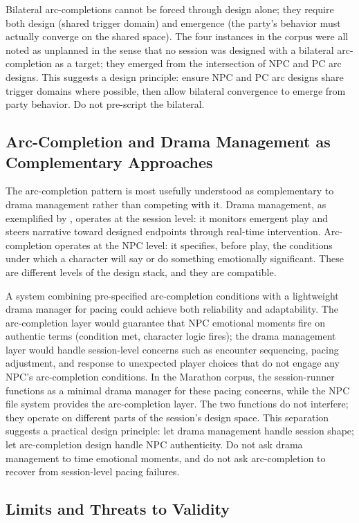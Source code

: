 Bilateral arc-completions cannot be forced through design alone; they require
both design (shared trigger domain) and emergence (the party's behavior must
actually converge on the shared space). The four instances in the corpus were
all noted as unplanned in the sense that no session was designed with a
bilateral arc-completion as a target; they emerged from the intersection of
NPC and PC arc designs. This suggests a design principle: ensure NPC and PC
arc designs share trigger domains where possible, then allow bilateral
convergence to emerge from party behavior. Do not pre-script the bilateral.

\subsection{Arc-Completion and Drama Management as Complementary Approaches}

The arc-completion pattern is most usefully understood as complementary to drama
management rather than competing with it. Drama management, as exemplified by
\citet{mateas2003faade}, operates at the session level: it monitors emergent play
and steers narrative toward designed endpoints through real-time intervention.
Arc-completion operates at the NPC level: it specifies, before play, the conditions
under which a character will say or do something emotionally significant. These
are different levels of the design stack, and they are compatible.

A system combining pre-specified arc-completion conditions with a lightweight drama
manager for pacing could achieve both reliability and adaptability. The arc-completion
layer would guarantee that NPC emotional moments fire on authentic terms (condition
met, character logic fires); the drama management layer would handle session-level
concerns such as encounter sequencing, pacing adjustment, and response to unexpected
player choices that do not engage any NPC's arc-completion conditions. In the Marathon
corpus, the session-runner functions as a minimal drama manager for these pacing
concerns, while the NPC file system provides the arc-completion layer. The two
functions do not interfere; they operate on different parts of the session's design
space. This separation suggests a practical design principle: let drama management
handle session shape; let arc-completion design handle NPC authenticity. Do not ask
drama management to time emotional moments, and do not ask arc-completion to recover
from session-level pacing failures.

\subsection{Limits and Threats to Validity}

